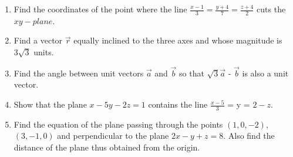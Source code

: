 \documentclass[12pt,-letter paper]{article}
\providecommand{\brak}[1]{\ensuremath{\left(#1\right)}}
\begin{document}
\begin{enumerate}
\item Find the coordinates of the point where the line $\frac{x-1}{3} = \frac{y+4}{7} = \frac{z+4}{2}$ cuts the $xy-plane$.
\item Find a vector $\overrightarrow{r}$ equally inclined to the three axes and whose magnitude is $3\sqrt{3}$ units.
\item Find the angle between unit vectors $\overrightarrow{a}$ and $\overrightarrow{b}$ so that $\sqrt{3}\overrightarrow{a}$ - $\overrightarrow{b}$ is also a unit vector.
\item Show that the plane $x - 5y - 2z = 1$ contains the line $\frac{x - 5}{3}$ = y = $2 -z$.
\item Find the equation of the plane passing through the points $\brak{1, 0, -2}$,  $\brak{3, -1, 0}$ and perpendicular to the plane $2x - y + z = 8$. Also find the distance of the plane thus obtained from the origin.
\end{enumerate}
\end{document}
